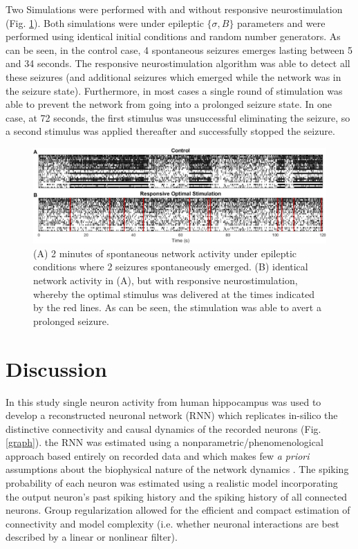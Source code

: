 \documentclass[11pt,a4paper,final]{article}
\begin{document}
Two Simulations were performed with and without responsive neurostimulation (Fig. \ref{RS}).
Both simulations were under epileptic $\{\sigma,B\}$ parameters and were performed using identical initial conditions and random number generators.
As can be seen, in the control case, 4 spontaneous seizures emerges lasting between 5 and 34 seconds.
The responsive neurostimulation algorithm was able to detect all these seizures (and additional seizures which emerged while the network was in the seizure state).
Furthermore, in most cases a single round of stimulation was able to prevent the network from going into a prolonged seizure state.
In one case, at 72 seconds, the first stimulus was unsuccessful eliminating the seizure, so a second stimulus was applied thereafter and successfully stopped the seizure.

\begin{figure}[!ht]
\centering
\includegraphics[width=180mm]{RS}
\caption[Responsive Stimulation]{
(A) 2 minutes of spontaneous network activity under epileptic conditions where 2 seizures spontaneously emerged.
(B) identical network activity in (A), but with responsive neurostimulation, whereby the optimal \len{} stimulus was delivered at the times indicated by the red lines. As can be seen, the stimulation was able to avert a prolonged seizure.}
\label{RS}
\end{figure}

\section{Discussion \label{disc}}

In this study single neuron activity from human hippocampus was used to develop a reconstructed neuronal network (RNN) which replicates in-silico the distinctive connectivity and causal dynamics of the recorded \nn{} neurons (Fig. \ref{graph}).
the RNN was estimated using a nonparametric/phenomenological approach based entirely on recorded data and which makes few \textit{a priori} assumptions about the biophysical nature of the network dynamics \citep{pillow08}.
The spiking probability of each neuron was estimated using a realistic model incorporating the output neuron's past spiking history and the spiking history of all connected neurons.
Group regularization allowed for the efficient and compact estimation of connectivity and model complexity (i.e. whether neuronal interactions are best described by a linear or nonlinear filter).
\end{document}
